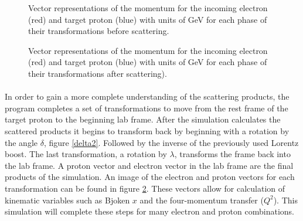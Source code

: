 \begin{figure}[]
  \centering
  \quad
  \centering
  \vspace{0.25cm}
  \centering
  \quad
  \centering
   \vspace{0.25cm} 
  \caption{Vector representations of the momentum for the incoming electron (red) and  target proton (blue) with units of GeV for each phase of their transformations before scattering.}
  \label{transform}
  \end{figure}
  \begin{figure}[p!]
	\centering
	\quad
	\centering
	\vspace{0.25cm}
	\centering
	\quad
	\centering
	\vspace{0.25cm}	
	\caption{Vector representations of the momentum for the incoming electron (red) and  target proton (blue) with units of GeV for each phase of their transformations after scattering).}
	\label{transform2}
\end{figure}

  \paragraph{}
  In order to gain a more complete understanding of the scattering products, the program completes a set of transformations to move from the rest frame of the target proton to the beginning lab frame. After the simulation calculates the scattered products it begins to transform back by beginning with a rotation by the angle $\delta$, figure \ref{delta2}. Followed by the inverse of the previously used Lorentz boost. The last transformation, a rotation by $\lambda$, transforms the frame back into the lab frame. A proton vector and electron vector in the lab frame are the final products of the simulation. An image of the electron and proton vectors for each transformation can be found in figure \ref{transform2}. These vectors allow for calculation of kinematic variables such as Bjoken $x$ and the four-momentum transfer ($Q^2$).  This simulation will complete these steps for many electron and proton combinations.


